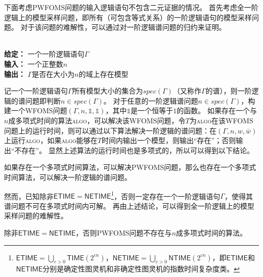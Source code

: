 \documentclass[12pt,UTF8,AutoFakeBold=3,a4paper]{ctexart} %
\newcommand{\sentence}{\Gamma}
\newcommand{\weight}{w}
\newcommand{\negweight}{\bar{w}}
\newcommand{\wfoms}{WFOMS}
\begin{document}

下面考虑PWFOMS问题的输入逻辑语句不包含二元证据的情况。
首先考虑全一阶逻辑上的模型采样问题，即所有（可包含等式关系）的一阶逻辑语句的模型采样问题。
对于该问题的难解性，可以通过对一阶逻辑谱问题的归约来证明。

\begin{problem}[一阶逻辑的谱问题]\label{prob:fo_spectrum}
  \ \\
  \textbf{给定：} 一个一阶逻辑语句$\sentence$\\
  \textbf{输入：} 一个正整数$n$\\
  \textbf{输出：} $\sentence$是否在大小为$n$的域上存在模型
\end{problem}

记一个一阶逻辑语句$\sentence$所有模型大小的集合为$spec(\sentence)$（又称作$\sentence$的谱），则一阶逻辑的谱问题即判断$n\in spec(\sentence)$。
对于任意的一阶逻辑谱问题$n \in spec(\sentence)$，构建一个\wfoms{}问题$(\sentence, n, \mathds{1}, \mathds{1})$，其中$\mathds{1}$是一个恒等于$1$的函数。
如果存在一个与$n$成多项式时间的算法\textsc{algo}，可以解决该\wfoms{}问题，令$T$为\textsc{algo}在该\wfoms{}问题上的运行时间，则可以通过以下算法解决一阶逻辑的谱问题：在$(\sentence, n, \weight, \negweight)$上运行\textsc{algo}，如果\textsc{algo}能够在$T$时间内输出一个模型，则输出“存在”；否则输出“不存在”。
显然上述算法的运行时间也是多项式的，所以可以得到以下结论。

\begin{proposition}\label{prop:pwfoms_spectrum}
  如果存在一个多项式时间算法，可以解决PWFOMS问题，那么也存在一个多项式时间算法，可以解决一阶逻辑的谱问题。
\end{proposition}

然而，已知除非$\mathsf{ETIME} = \mathsf{NETIME}$\footnote{
$\mathsf{ETIME} = \bigcup_{c>0} \mathsf{TIME}(2^{cn})$，$\mathsf{NETIME} = \bigcup_{c>0} \mathsf{NTIME}(2^{cn})$，即$\mathsf{ETIME}$和$\mathsf{NETIME}$分别是确定性图灵机和非确定性图灵机的指数时间复杂度类。}，否则一定存在一个一阶逻辑语句$\sentence$，使得其谱问题不可在多项式时间内可解。
再由上述结论，可以得到全一阶逻辑上的模型采样问题的难解性。
\begin{theorem}
  除非$\mathsf{ETIME} = \mathsf{NETIME}$，否则PWFOMS问题不存在与$n$成多项式时间的算法。
\end{theorem}
\end{document}
